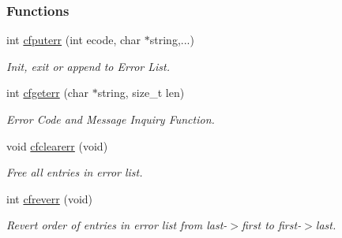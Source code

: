 \subsubsection*{Functions}
\begin{CompactItemize}
\item 
int \hyperlink{group__errors_gad2687826308f21b54657d2728e4cfcc}{cfputerr} (int ecode, char $\ast$string,...)
\begin{CompactList}\small\item\em Init, exit or append to Error List. \item\end{CompactList}\item 
int \hyperlink{group__errors_g2dc49b60b3ec7a82086e60f4b1c41e18}{cfgeterr} (char $\ast$string, size\_\-t len)
\begin{CompactList}\small\item\em Error Code and Message Inquiry Function. \item\end{CompactList}\item 
void \hyperlink{group__errors_gad0c79adfdf363a11532dc4039136ec6}{cfclearerr} (void)
\begin{CompactList}\small\item\em Free all entries in error list. \item\end{CompactList}\item 
int \hyperlink{group__errors_gbc3a143038fbcabc944d224e20ca50f8}{cfreverr} (void)
\begin{CompactList}\small\item\em Revert order of entries in error list from last-$>$first to first-$>$last. \item\end{CompactList}\end{CompactItemize}
